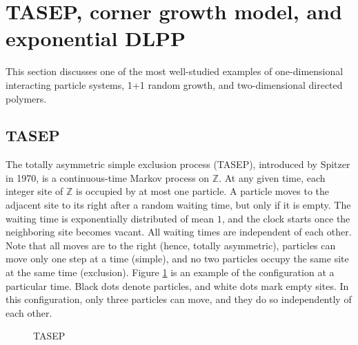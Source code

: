 \documentclass[10pt]{article}
\theoremstyle{plain}
\theoremstyle{definition}
\newcommand{\Z}{\mathbb{Z}}
\numberwithin{equation}{section}
\begin{document}
\section{TASEP, corner growth model, and exponential DLPP} \label{sec:TASEP}

This section discusses one of the most well-studied examples of one-dimensional interacting particle systems, 1+1 random growth, and two-dimensional directed polymers. %



\subsection{TASEP} 

The totally asymmetric simple exclusion process (TASEP), introduced by Spitzer \cite{Spitzer70} in 1970, is a continuous-time Markov process on $\Z$. 
At any given time, each integer site of $\Z$ is occupied by at most one particle. 
A particle moves to the adjacent site to its right after a random waiting time, but only if it is empty. The waiting time is exponentially distributed of mean $1$, and the clock starts once the neighboring site becomes vacant. 
All waiting times are independent of each other. 
Note that all moves are to the right (hence, totally asymmetric),  particles can move only one step at a time (simple), and no two particles occupy the same site at the same time (exclusion). 
Figure \ref{fig:TASEP} is an example of the configuration at a particular time. 
Black dots denote particles, and white dots mark empty sites. 
In this configuration, only three particles can move, and they do so independently of each other. 


\begin{figure}\centering
{}
\caption{TASEP}
\label{fig:TASEP}
\end{figure}
\end{document}
